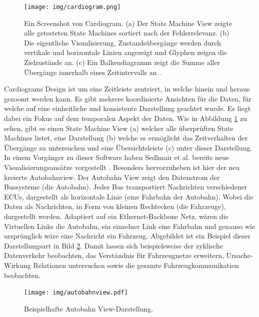\documentclass[draft=false
              ,paper=a4
              ,twoside=false
              ,fontsize=11pt
              ,headsepline
              ,BCOR10mm
              ,DIV11
              ]{scrbook}
\begin{document}
\begin{figure}[htbp]
  \centering
  \texttt{[image: img/cardiogram.png]}
  \caption{Ein Screenshot von Cardiogram. (a) Der State Machine View zeigte alle getesteten State Machines sortiert nach der Fehlerrelevanz. (b) Die eigentliche Visualisierung, Zustandsübergänge werden durch vertikale und horizontale Linien angezeigt und Glyphen zeigen die Zielzustände an. (c) Ein Balkendiagramm zeigt die Summe aller Übergänge innerhalb eines Zeitintervalls an \cite{sedlmair_cardiogram:_2011}.}
  \label{fig:cardiogram}
\end{figure}

Cardiograms Design ist um eine Zeitleiste zentriert, in welche hinein und heraus gezoomt werden kann. Es gibt mehrere koordinierte Ansichten für die Daten, für welche auf eine einheitliche und konsistente Darstellung geachtet wurde. Es liegt dabei ein Fokus auf dem temporalen Aspekt der Daten. Wie in Abbildung \ref{fig:cardiogram} zu sehen, gibt es einen State Machine View (a) welcher alle überprüften State Machines listet, eine Darstellung (b) welche es ermöglicht das Zeitverhalten der Übergänge zu untersuchen und eine Übersichtsleiste (c) unter dieser Darstellung. In einem Vorgänger zu dieser Software haben Sedlmair et al. bereits neue Visualisierungsansätze vorgestellt \cite{sedlmair2009}. Besonders hervorzuheben ist hier der neu kreierte Autobahnview. Der Autobahn View zeigt den Datenstrom der Bussysteme (die Autobahn). Jeder Bus transportiert Nachrichten verschiedener ECUs, dargestellt als horizontale Linie (eine Fahrbahn der Autobahn). Wobei die Daten als Nachrichten, in Form von kleinen Rechtecken (die Fahrzeuge), dargestellt werden. Adaptiert auf ein Ethernet-Backbone Netz, wären die Virtuellen Links die Autobahn, ein einzelner Link eine Fahrbahn und genauso wie ursprünglich wäre eine Nachricht ein Fahrzeug. Abgebildet ist ein Beispiel dieser Darstellungsart in Bild \ref{fig:autobahnview}. Damit lassen sich beispielsweise der zyklische Datenverkehr beobachten, das Verständnis für Fahrzeugnetze erweitern, Ursache-Wirkung Relationen untersuchen sowie die gesamte Fahrzeugkommunikation beobachten. 

\begin{figure}[htbp]
  \centering
  \texttt{[image: img/autobahnview.pdf]}
  \caption{Beispielhafte Autobahn View-Darstellung.}
  \label{fig:autobahnview}
\end{figure}
\end{document}
